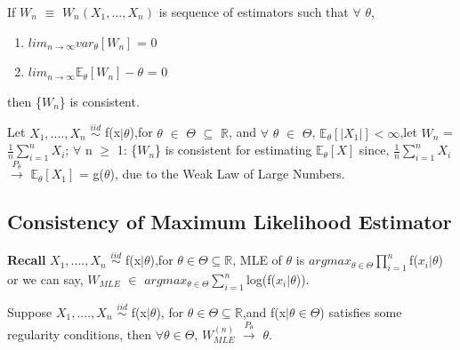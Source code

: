 \documentclass[a4paper,english,12pt]{article}
\begin{document}
\begin{thm}
	If $W_n$ $\equiv$ $W_n(X_1,...,X_n)$ is sequence of estimators such that $\forall$ $\theta$,
	\begin{enumerate}
		\item $lim_{n \rightarrow \infty}var_\theta[W_n]$ = 0
		\item $lim_{n \rightarrow \infty}\mathbb{E}_\theta[W_n]-\theta$ = 0
	\end{enumerate}
	then \{$W_n$\} is consistent.
\end{thm}
\begin{exmp}
	Let $X_1,....,X_n$ 	$\overset{iid}{\sim}$ f(x$\vert \theta$),for $\theta$ $\in$ $\Theta$ $\subseteq$ $\mathbb{R}$, and $\forall$ $\theta$ $\in$ $\Theta$, $\mathbb{E}_\theta[\vert X_1\vert]<\infty$,let $W_n$ = $\frac{1}{n}\sum_{i=1}^{n}X_i$; $\forall$ n $\geq$ 1:
	\newline \{$W_n$\} is consistent for estimating $\mathbb{E}_\theta[X]$ since, $\frac{1}{n}\sum_{i=1}^{n}X_i$ $\overset{P_\theta}{\rightarrow}$ $\mathbb{E}_\theta[X_1]$ = g($\theta$), due to the Weak Law of Large Numbers.
\end{exmp}

\subsection{Consistency of Maximum Likelihood Estimator}
\textbf{Recall}  $X_1,....,X_n$ $\overset{iid}{\sim}$ f(x$\vert \theta$),for $\theta\in\Theta\subseteq\mathbb{R}$,
MLE of $\theta$ is $argmax_{\theta \in \Theta} \prod_{i=1}^{n}$f($x_i\vert\theta$) or we can say,
\newline $W_{MLE}$ $\in$ $argmax_{\theta \in \Theta} \sum_{i=1}^{n}$log(f($x_i\vert\theta$)).
\begin{thm}
	Suppose $X_1,....,X_n$ $\overset{iid}{\sim}$ f(x$\vert \theta$),
	\newline for $\theta\in\Theta\subseteq\mathbb{R}$,and f(x$\vert\theta\in\Theta$) satisfies some regularity conditions, then $\forall \theta \in\Theta$, $W_{MLE}^{(n)}$ $\overset{P_\theta}{\rightarrow}$ $\theta$.
\end{thm}	
	
\end{document}
